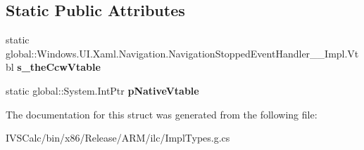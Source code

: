\subsection*{Static Public Attributes}
\begin{DoxyCompactItemize}
\item 
\mbox{\label{struct_windows_1_1_u_i_1_1_xaml_1_1_navigation_1_1_navigation_stopped_event_handler_____impl_1_1_vtbl_a6f15e3d34f7e41bc83d158d20cb944c2}} 
static global\+::\+Windows.\+U\+I.\+Xaml.\+Navigation.\+Navigation\+Stopped\+Event\+Handler\+\_\+\+\_\+\+Impl.\+Vtbl {\bfseries s\+\_\+the\+Ccw\+Vtable}
\item 
\mbox{\label{struct_windows_1_1_u_i_1_1_xaml_1_1_navigation_1_1_navigation_stopped_event_handler_____impl_1_1_vtbl_a240c582d6e33b8299c03cd6dd555995d}} 
static global\+::\+System.\+Int\+Ptr {\bfseries p\+Native\+Vtable}
\end{DoxyCompactItemize}


The documentation for this struct was generated from the following file\+:\begin{DoxyCompactItemize}
\item 
I\+V\+S\+Calc/bin/x86/\+Release/\+A\+R\+M/ilc/Impl\+Types.\+g.\+cs\end{DoxyCompactItemize}
